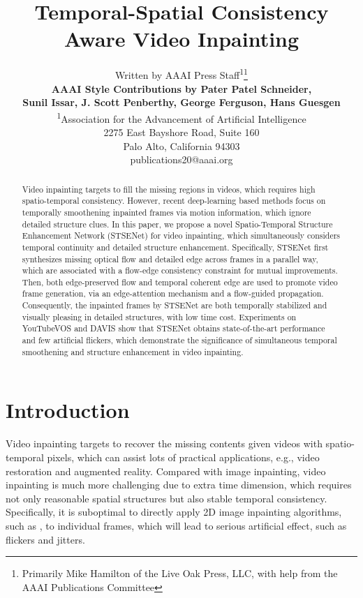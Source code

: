 \documentclass[letterpaper]{article} %
\title{Temporal-Spatial Consistency Aware Video Inpainting }
\author{Written by AAAI Press Staff\textsuperscript{\rm 1}\thanks{Primarily Mike Hamilton of the Live Oak Press, LLC, with help from the AAAI Publications Committee}\\ \Large \textbf{AAAI Style Contributions by
Pater Patel Schneider,} \\ \Large \textbf{Sunil Issar, J. Scott Penberthy, George Ferguson, Hans Guesgen}\\ %
\textsuperscript{\rm 1}Association for the Advancement of Artificial Intelligence\\ %
2275 East Bayshore Road, Suite 160\\
Palo Alto, California 94303\\
publications20@aaai.org %
}
\begin{document}
\maketitle

\begin{abstract}
Video inpainting targets to fill the missing regions in videos, which requires high spatio-temporal consistency.
However, recent deep-learning based methods focus on temporally smoothening inpainted frames via motion information, which ignore detailed structure clues.
In this paper, we propose a novel Spatio-Temporal Structure Enhancement Network (STSENet) for video inpainting, which simultaneously considers temporal continuity and detailed structure enhancement. 
Specifically, STSENet first synthesizes missing optical flow and detailed edge across frames in a parallel way, which are associated with a flow-edge consistency constraint for mutual improvements.
Then, both edge-preserved flow and temporal coherent edge are used to promote video frame generation, via an edge-attention mechanism and a flow-guided propagation.
Consequently, the inpainted frames by STSENet are both temporally stabilized and visually pleasing in detailed structures, with low time cost. 
Experiments on YouTubeVOS and DAVIS show that STSENet obtains state-of-the-art performance and few artificial flickers, which demonstrate the significance of simultaneous temporal smoothening and structure enhancement in video inpainting.

\end{abstract}




\section{Introduction}
\noindent Video inpainting targets to recover the missing contents given videos with spatio-temporal pixels, which can assist lots of practical applications, e.g., video restoration and augmented reality. Compared with image inpainting, video inpainting is much more challenging due to extra time dimension, which requires not only reasonable spatial structures but also stable temporal consistency. Specifically, it is suboptimal to directly apply 2D image inpainting algorithms, such as \cite{yu2018free,Xiong_2019_CVPR}, to individual frames, which will lead to serious artificial effect, such as flickers and jitters. 
\end{document}
